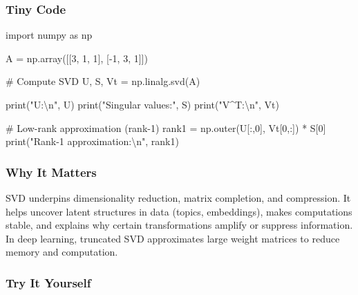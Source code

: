 \documentclass[
  letterpaper,
  DIV=11,
  numbers=noendperiod]{scrreprt}
\newenvironment{Shaded}{\begin{snugshade}}{\end{snugshade}}
\newcommand{\BuiltInTok}[1]{\textcolor[rgb]{0.00,0.23,0.31}{#1}}
\newcommand{\CharTok}[1]{\textcolor[rgb]{0.13,0.47,0.30}{#1}}
\newcommand{\CommentTok}[1]{\textcolor[rgb]{0.37,0.37,0.37}{#1}}
\newcommand{\DecValTok}[1]{\textcolor[rgb]{0.68,0.00,0.00}{#1}}
\newcommand{\ImportTok}[1]{\textcolor[rgb]{0.00,0.46,0.62}{#1}}
\newcommand{\NormalTok}[1]{\textcolor[rgb]{0.00,0.23,0.31}{#1}}
\newcommand{\OperatorTok}[1]{\textcolor[rgb]{0.37,0.37,0.37}{#1}}
\newcommand{\StringTok}[1]{\textcolor[rgb]{0.13,0.47,0.30}{#1}}
\begin{document}
\subsubsection{Tiny Code}\label{tiny-code-107}

\begin{Shaded}
\begin{Highlighting}[]
\ImportTok{import}\NormalTok{ numpy }\ImportTok{as}\NormalTok{ np}

\NormalTok{A }\OperatorTok{=}\NormalTok{ np.array([[}\DecValTok{3}\NormalTok{, }\DecValTok{1}\NormalTok{, }\DecValTok{1}\NormalTok{],}
\NormalTok{              [}\OperatorTok{{-}}\DecValTok{1}\NormalTok{, }\DecValTok{3}\NormalTok{, }\DecValTok{1}\NormalTok{]])}

\CommentTok{\# Compute SVD}
\NormalTok{U, S, Vt }\OperatorTok{=}\NormalTok{ np.linalg.svd(A)}

\BuiltInTok{print}\NormalTok{(}\StringTok{"U:}\CharTok{\textbackslash{}n}\StringTok{"}\NormalTok{, U)}
\BuiltInTok{print}\NormalTok{(}\StringTok{"Singular values:"}\NormalTok{, S)}
\BuiltInTok{print}\NormalTok{(}\StringTok{"V\^{}T:}\CharTok{\textbackslash{}n}\StringTok{"}\NormalTok{, Vt)}

\CommentTok{\# Low{-}rank approximation (rank{-}1)}
\NormalTok{rank1 }\OperatorTok{=}\NormalTok{ np.outer(U[:,}\DecValTok{0}\NormalTok{], Vt[}\DecValTok{0}\NormalTok{,:]) }\OperatorTok{*}\NormalTok{ S[}\DecValTok{0}\NormalTok{]}
\BuiltInTok{print}\NormalTok{(}\StringTok{"Rank{-}1 approximation:}\CharTok{\textbackslash{}n}\StringTok{"}\NormalTok{, rank1)}
\end{Highlighting}
\end{Shaded}

\subsubsection{Why It Matters}\label{why-it-matters-5}

SVD underpins dimensionality reduction, matrix completion, and
compression. It helps uncover latent structures in data (topics,
embeddings), makes computations stable, and explains why certain
transformations amplify or suppress information. In deep learning,
truncated SVD approximates large weight matrices to reduce memory and
computation.

\subsubsection{Try It Yourself}\label{try-it-yourself-107}
\end{document}
